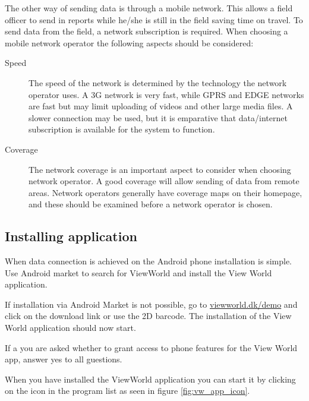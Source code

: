 \documentclass[a4paper, 12pt, final]{article}
\begin{document}
The other way of sending data is through a mobile network. This allows a field officer to send in reports while he/she is still in the field saving time on travel. To send data from the field, a network subscription is required. When choosing a mobile network operator the following aspects should be considered:

\begin{description}
\item[Speed] The speed of the network is determined by the technology the network operator uses. A 3G network is very fast, while GPRS and EDGE networks are fast but may limit uploading of videos and other large media files. A slower connection may be used, but it is emparative that data/internet subscription is available for the system to function.
\item[Coverage] The network coverage is an important aspect to consider when choosing network operator. A good coverage will allow sending of data from remote areas. Network operators generally have coverage maps on their homepage, and these should be examined before a network operator is chosen.
\end{description}


\subsection{Installing application}

When data connection is achieved on the Android phone installation is simple. Use Android market to search for ViewWorld and install the View World application. 

If installation via Android Market is not possible, go to \url{viewworld.dk/demo} and click on the download link or use the 2D barcode. The installation of the View World application should now start.

If a you are asked whether to grant access to phone features for the View World app, answer yes to all guestions.

When you have installed the ViewWorld application you can start it by clicking on the icon in the program list as seen in figure \ref{fig:vw_app_icon}.
\end{document}
